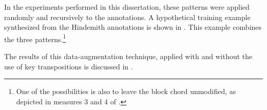 In the experiments performed in this dissertation, these
patterns were applied randomly and recursively to the
annotations. A hypothetical training example synthesized
from the Hindemith annotations is shown in
. This example combines the
three patterns.\footnote{One of the possibilities is also to
leave the block chord unmodified, as depicted in measures 3
and 4 of .}


The results of this data-augmentation technique, applied
with and without the use of key transpositions is discussed
in .
